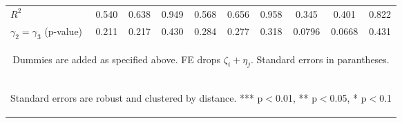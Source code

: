 \begin{center}
\begin{tabular}{lccccccccc}
$R^2$ & 0.540 & 0.638 & 0.949 & 0.568 & 0.656 & 0.958 & 0.345 & 0.401 & 0.822 \\
 $\gamma_2=\gamma_3 $ (p-value) & 0.211 & 0.217 & 0.430 & 0.284 & 0.277 & 0.318 & 0.0796 & 0.0668 & 0.431 \\ \hline
\multicolumn{10}{c}{\begin{footnotesize} Dummies are added as specified above. FE drops $\zeta_i+\eta_j$. Standard errors in parantheses.\end{footnotesize}} \\
\multicolumn{10}{c}{\begin{footnotesize} Standard errors are robust and clustered by distance. *** p$<$0.01, ** p$<$0.05, * p$<$0.1\end{footnotesize}} \\
\end{tabular}
\end{center}

